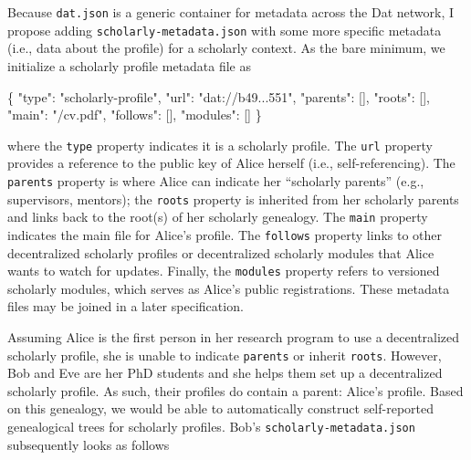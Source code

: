 \documentclass[a5paper]{book}
\newenvironment{Shaded}{\begin{snugshade}}{\end{snugshade}}
\newcommand{\DataTypeTok}[1]{\textcolor[rgb]{0.13,0.29,0.53}{#1}}
\newcommand{\StringTok}[1]{\textcolor[rgb]{0.31,0.60,0.02}{#1}}
\newcommand{\OtherTok}[1]{\textcolor[rgb]{0.56,0.35,0.01}{#1}}
\newcommand{\FunctionTok}[1]{\textcolor[rgb]{0.00,0.00,0.00}{#1}}
\begin{document}
Because \texttt{dat.json} is a generic container for metadata across the
Dat network, I propose adding \texttt{scholarly-metadata.json} with some
more specific metadata (i.e., data about the profile) for a scholarly
context. As the bare minimum, we initialize a scholarly profile metadata
file as

\begin{Shaded}
\begin{Highlighting}[]
\FunctionTok{\{}
  \DataTypeTok{"type"}\FunctionTok{:} \StringTok{"scholarly-profile"}\FunctionTok{,}
  \DataTypeTok{"url"}\FunctionTok{:} \StringTok{"dat://b49...551"}\FunctionTok{,}
  \DataTypeTok{"parents"}\FunctionTok{:} \OtherTok{[]}\FunctionTok{,}
  \DataTypeTok{"roots"}\FunctionTok{:} \OtherTok{[]}\FunctionTok{,}
  \DataTypeTok{"main"}\FunctionTok{:} \StringTok{"/cv.pdf"}\FunctionTok{,}
  \DataTypeTok{"follows"}\FunctionTok{:} \OtherTok{[]}\FunctionTok{,}
  \DataTypeTok{"modules"}\FunctionTok{:} \OtherTok{[]}
\FunctionTok{\}}
\end{Highlighting}
\end{Shaded}

where the \texttt{type} property indicates it is a scholarly profile.
The \texttt{url} property provides a reference to the public key of
Alice herself (i.e., self-referencing). The \texttt{parents} property is
where Alice can indicate her \enquote{scholarly parents} (e.g.,
supervisors, mentors); the \texttt{roots} property is inherited from her
scholarly parents and links back to the root(s) of her scholarly
genealogy. The \texttt{main} property indicates the main file for
Alice's profile. The \texttt{follows} property links to other
decentralized scholarly profiles or decentralized scholarly modules that
Alice wants to watch for updates. Finally, the \texttt{modules} property
refers to versioned scholarly modules, which serves as Alice's public
registrations. These metadata files may be joined in a later
specification.

Assuming Alice is the first person in her research program to use a
decentralized scholarly profile, she is unable to indicate
\texttt{parents} or inherit \texttt{roots}. However, Bob and Eve are her
PhD students and she helps them set up a decentralized scholarly
profile. As such, their profiles do contain a parent: Alice's profile.
Based on this genealogy, we would be able to automatically construct
self-reported genealogical trees for scholarly profiles. Bob's
\texttt{scholarly-metadata.json} subsequently looks as follows
\end{document}
